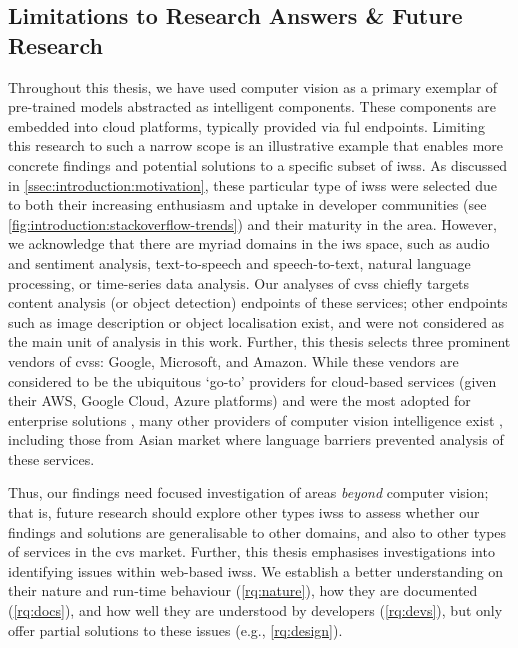 \subsection{Limitations to Research Answers \& Future Research}

Throughout this thesis, we have used computer vision as a primary exemplar of pre-trained  models abstracted as intelligent  components. These components are embedded into cloud platforms, typically provided via ful  endpoints. Limiting this research to such a narrow scope is an illustrative example that enables more concrete findings and potential solutions to a specific subset of \glspl{iws}. As discussed in \cref{ssec:introduction:motivation}, these particular type of \glspl{iws} were selected due to both their increasing enthusiasm and uptake in developer communities (see \cref{fig:introduction:stackoverflow-trends}) and their maturity in the area. However, we acknowledge that there are myriad domains in the \gls{iws} space, such as audio and sentiment analysis, text-to-speech and speech-to-text, natural language processing, or time-series data analysis. Our analyses of \glspl{cvs} chiefly targets content analysis (or object detection) endpoints of these services; other endpoints such as image description or object localisation exist, and were not considered as the main unit of analysis in this work. Further, this thesis selects three prominent vendors of \glspl{cvs}: Google, Microsoft, and Amazon. While these vendors are considered to be the ubiquitous `go-to' providers for cloud-based services (given their AWS, Google Cloud, Azure platforms) and were the most adopted for enterprise solutions \citep{RightScaleInc:2018kJ}, many other providers of computer vision intelligence exist , including those from Asian market  where language barriers prevented analysis of these services.

Thus, our findings need focused investigation of areas \textit{beyond} computer vision; that is, future research should explore other types \glspl{iws} to assess whether our findings and solutions are generalisable to other domains, and also to other types of services in the \gls{cvs} market. Further, this thesis emphasises investigations into identifying issues within web-based \glspl{iws}. We establish a better understanding on their nature and run-time behaviour  (\ref{rq:nature}), how they are documented (\ref{rq:docs}), and how well they are understood by developers (\ref{rq:devs}), but only offer partial solutions to these issues (e.g., \ref{rq:design}). 

